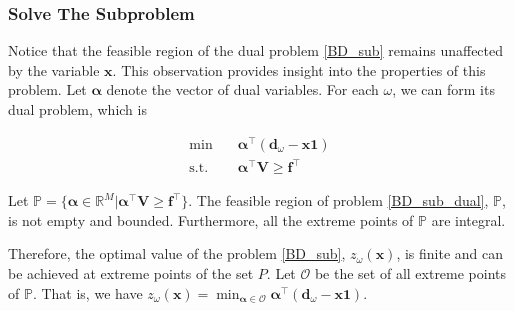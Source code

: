 \subsubsection{Solve The Subproblem}\label{second_stage}

Notice that the feasible region of the dual problem \eqref{BD_sub} remains unaffected by the variable $\mathbf{x}$. This observation provides insight into the properties of this problem. Let $\bm{\alpha}$ denote the vector of dual variables. For each $\omega$, we can form its dual problem, which is 

\begin{equation}\label{BD_sub_dual}
  \begin{aligned}
    \min \quad & \bm{\alpha}^{\intercal} (\mathbf{d}_{\omega}- \mathbf{x} \mathbf{1}) \\
    \text {s.t.} \quad & \bm{\alpha}^{\intercal} \mathbf{V} \geq \mathbf{f}^{\intercal}
  \end{aligned}
\end{equation}


\begin{prop}\label{feasible_region}
Let $\mathbb{P} = \{\bm{\alpha} \in \mathbb{R}^{M}|\bm{\alpha}^{\intercal} \mathbf{V} \geq \mathbf{f}^{\intercal}\}$. The feasible region of problem \eqref{BD_sub_dual}, $\mathbb{P}$, is not empty and bounded. Furthermore, all the extreme points of $\mathbb{P}$ are integral. 
\end{prop}

Therefore, the optimal value of the problem \eqref{BD_sub}, $z_{\omega}(\mathbf{x})$, is finite and can be achieved at extreme points of the set $P$. Let $\mathcal{O}$ be the set of all extreme points of $\mathbb{P}$. That is, we have $z_{\omega}(\mathbf{x}) = \min_{\bm{\alpha} \in \mathcal{O}} \bm{\alpha}^{\intercal}(\mathbf{d}_{\omega}- \mathbf{x} \mathbf{1})$.





